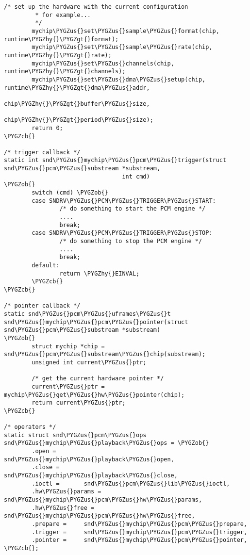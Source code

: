 \documentclass[a4paper,8pt,english]{sphinxmanual}
\def\PYGZus{\char`\_}
\def\PYGZob{\char`\{}
\def\PYGZcb{\char`\}}
\def\PYGZgt{\char`\>}
\def\PYGZhy{\char`\-}
\begin{document}
\begin{Verbatim}[commandchars=\\\{\}]
        /* set up the hardware with the current configuration
         * for example...
         */
        mychip\PYGZus{}set\PYGZus{}sample\PYGZus{}format(chip, runtime\PYGZhy{}\PYGZgt{}format);
        mychip\PYGZus{}set\PYGZus{}sample\PYGZus{}rate(chip, runtime\PYGZhy{}\PYGZgt{}rate);
        mychip\PYGZus{}set\PYGZus{}channels(chip, runtime\PYGZhy{}\PYGZgt{}channels);
        mychip\PYGZus{}set\PYGZus{}dma\PYGZus{}setup(chip, runtime\PYGZhy{}\PYGZgt{}dma\PYGZus{}addr,
                             chip\PYGZhy{}\PYGZgt{}buffer\PYGZus{}size,
                             chip\PYGZhy{}\PYGZgt{}period\PYGZus{}size);
        return 0;
\PYGZcb{}

/* trigger callback */
static int snd\PYGZus{}mychip\PYGZus{}pcm\PYGZus{}trigger(struct snd\PYGZus{}pcm\PYGZus{}substream *substream,
                                  int cmd)
\PYGZob{}
        switch (cmd) \PYGZob{}
        case SNDRV\PYGZus{}PCM\PYGZus{}TRIGGER\PYGZus{}START:
                /* do something to start the PCM engine */
                ....
                break;
        case SNDRV\PYGZus{}PCM\PYGZus{}TRIGGER\PYGZus{}STOP:
                /* do something to stop the PCM engine */
                ....
                break;
        default:
                return \PYGZhy{}EINVAL;
        \PYGZcb{}
\PYGZcb{}

/* pointer callback */
static snd\PYGZus{}pcm\PYGZus{}uframes\PYGZus{}t
snd\PYGZus{}mychip\PYGZus{}pcm\PYGZus{}pointer(struct snd\PYGZus{}pcm\PYGZus{}substream *substream)
\PYGZob{}
        struct mychip *chip = snd\PYGZus{}pcm\PYGZus{}substream\PYGZus{}chip(substream);
        unsigned int current\PYGZus{}ptr;

        /* get the current hardware pointer */
        current\PYGZus{}ptr = mychip\PYGZus{}get\PYGZus{}hw\PYGZus{}pointer(chip);
        return current\PYGZus{}ptr;
\PYGZcb{}

/* operators */
static struct snd\PYGZus{}pcm\PYGZus{}ops snd\PYGZus{}mychip\PYGZus{}playback\PYGZus{}ops = \PYGZob{}
        .open =        snd\PYGZus{}mychip\PYGZus{}playback\PYGZus{}open,
        .close =       snd\PYGZus{}mychip\PYGZus{}playback\PYGZus{}close,
        .ioctl =       snd\PYGZus{}pcm\PYGZus{}lib\PYGZus{}ioctl,
        .hw\PYGZus{}params =   snd\PYGZus{}mychip\PYGZus{}pcm\PYGZus{}hw\PYGZus{}params,
        .hw\PYGZus{}free =     snd\PYGZus{}mychip\PYGZus{}pcm\PYGZus{}hw\PYGZus{}free,
        .prepare =     snd\PYGZus{}mychip\PYGZus{}pcm\PYGZus{}prepare,
        .trigger =     snd\PYGZus{}mychip\PYGZus{}pcm\PYGZus{}trigger,
        .pointer =     snd\PYGZus{}mychip\PYGZus{}pcm\PYGZus{}pointer,
\PYGZcb{};


\end{Verbatim}
\end{document}
